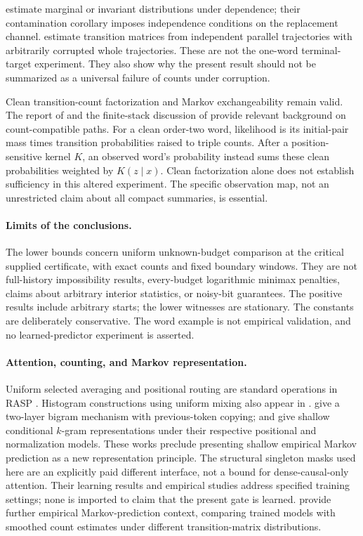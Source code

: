 \documentclass[11pt,letterpaper]{article}
\theoremstyle{definition}
\theoremstyle{remark}
\numberwithin{equation}{section}
\begin{document}
\citet{Lecestre2023} estimate marginal or invariant distributions under dependence; their contamination corollary imposes independence conditions on the replacement channel. \citet{LeskelaDreveton2026} estimate transition matrices from independent parallel trajectories with arbitrarily corrupted whole trajectories. These are not the one-word terminal-target experiment. They also show why the present result should not be summarized as a universal failure of counts under corruption.

Clean transition-count factorization and Markov exchangeability remain valid. The report of \citet{DiaconisFreedman1978} and the finite-stack discussion of \citet{HalberstamHutchcroft2024} provide relevant background on count-compatible paths. For a clean order-two word, likelihood is its initial-pair mass times transition probabilities raised to triple counts. After a position-sensitive kernel $K$, an observed word's probability instead sums these clean probabilities weighted by $K(z\mid x)$. Clean factorization alone does not establish sufficiency in this altered experiment. The specific observation map, not an unrestricted claim about all compact summaries, is essential.

\paragraph{Limits of the conclusions.}
The lower bounds concern uniform unknown-budget comparison at the critical supplied certificate, with exact counts and fixed boundary windows. They are not full-history impossibility results, every-budget logarithmic minimax penalties, claims about arbitrary interior statistics, or noisy-bit guarantees. The positive results include arbitrary starts; the lower witnesses are stationary. The constants are deliberately conservative. The word example is not empirical validation, and no learned-predictor experiment is asserted.

\paragraph{Attention, counting, and Markov representation.}
Uniform selected averaging and positional routing are standard operations in RASP \citep{WeissGoldbergYahav2021}. Histogram constructions using uniform mixing also appear in \citet{BehrensEtAl2024}. \citet[Proposition 2.1]{EdelmanEtAl2024} give a two-layer bigram mechanism with previous-token copying; \citet{RajaramanEtAl2024} and \citet{EkboteEtAl2025} give shallow conditional $k$-gram representations under their respective positional and normalization models. These works preclude presenting shallow empirical Markov prediction as a new representation principle. The structural singleton masks used here are an explicitly paid different interface, not a bound for dense-causal-only attention. Their learning results and empirical studies address specified training settings; none is imported to claim that the present gate is learned. \citet{LepageMaryPicard2025} provide further empirical Markov-prediction context, comparing trained models with smoothed count estimates under different transition-matrix distributions.
\end{document}
